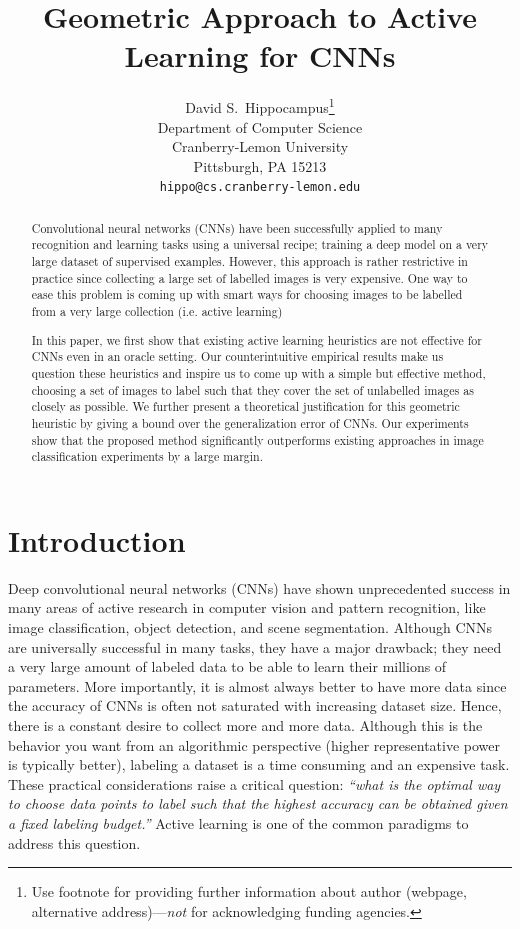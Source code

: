 \documentclass{article}
\title{Geometric Approach to Active Learning for CNNs}
\author{
  David S.~Hippocampus\thanks{Use footnote for providing further
    information about author (webpage, alternative
    address)---\emph{not} for acknowledging funding agencies.} \\
  Department of Computer Science\\
  Cranberry-Lemon University\\
  Pittsburgh, PA 15213 \\
  \texttt{hippo@cs.cranberry-lemon.edu} \\
}
\makeatletter
\newcommand*{\ie}{i.e.\@\xspace}
\makeatother
\begin{document}

\maketitle

\begin{abstract}
Convolutional neural networks (CNNs) have been successfully applied to many recognition and learning tasks using a universal recipe; training a deep model on a very large dataset of supervised examples. However, this approach is rather restrictive in practice since collecting a large set of labelled images is very expensive. One way to ease this problem is coming up with smart ways for choosing images to be labelled from a very large collection (\ie active learning)

In this paper, we first show that existing active learning heuristics are not effective for CNNs even in an oracle setting. Our counterintuitive empirical results make us question these heuristics and inspire us to come up with a simple but effective method, choosing a set of images to label such that they cover the set of unlabelled images as closely as possible. We further present a theoretical justification for this geometric heuristic by giving a bound over the generalization error of CNNs. Our experiments show that the proposed method significantly outperforms existing approaches in image classification experiments by a large margin.
\end{abstract}

\section{Introduction}
Deep convolutional neural networks (CNNs) have shown unprecedented success in many areas of active research in computer vision and pattern recognition, like image classification, object detection, and scene segmentation. Although CNNs are universally successful in many tasks, they have a major drawback; they need a very large amount of labeled data to be able to learn their millions of parameters. More importantly, it is almost always better to have more data since the accuracy of CNNs is often not saturated with increasing dataset size. Hence, there is a constant desire to collect more and more data. Although this is the behavior you want from an algorithmic perspective (higher representative power is typically better), labeling a dataset is a time consuming and an expensive task. These practical considerations raise a critical question: \emph{``what is the optimal way to choose data points to label such that the highest accuracy can be obtained given a fixed labeling budget.''} Active learning is one of the common paradigms to address this question.
\end{document}
